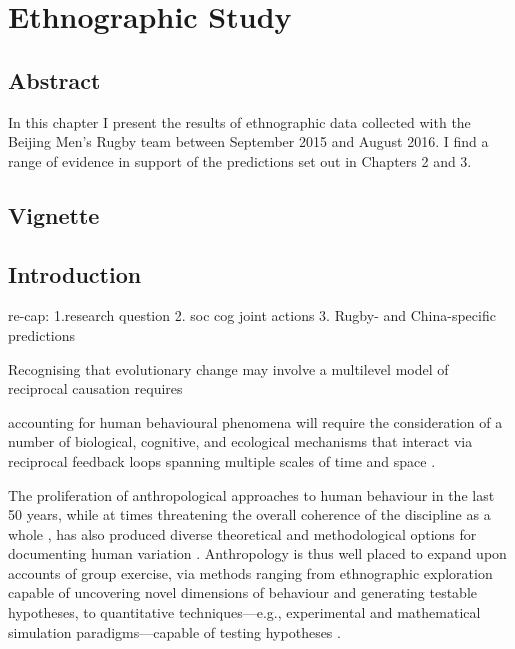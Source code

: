 


\chapter{\label{4ethnographicField}Ethnographic Study}

\minitoc
\section{Abstract}
In this chapter I present the results of ethnographic data collected with the Beijing Men's Rugby team between September 2015 and August 2016.  I find a range of evidence in support of the predictions set out in Chapters 2 and 3.




\section{Vignette}







\section{Introduction}


re-cap:
1.research question
2. soc cog joint actions
3. Rugby-  and China-specific predictions


Recognising that evolutionary change may involve a multilevel model of reciprocal causation requires

accounting for human behavioural phenomena will require the consideration of a number of biological, cognitive, and ecological mechanisms that interact via reciprocal feedback loops spanning multiple scales of time and space \citep{Fuentes2015}.


The proliferation of anthropological approaches to human behaviour in the last 50 years, while at times threatening the overall coherence of the discipline as a whole \citep{Beller2012}, has also produced diverse theoretical and methodological options for documenting human variation \citep{Fuentes2016a}.
Anthropology is thus well placed to expand upon accounts of group exercise, via methods ranging from ethnographic exploration capable of uncovering novel dimensions of behaviour and generating testable hypotheses, to quantitative techniques---e.g., experimental and mathematical simulation paradigms---capable of testing hypotheses \citep{Epstein2006,Fuentes2016}.

